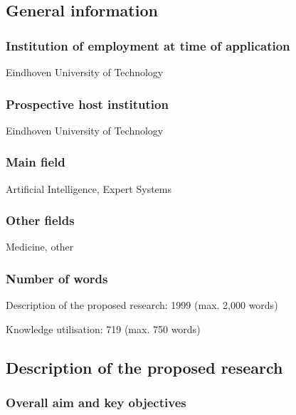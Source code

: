 \documentclass[serif, twocolumn, numeric, rga]{jote-article}
\begin{document}
\subsection*{General information}

\subsubsection*{Institution of employment at time of application}

Eindhoven University of Technology

\subsubsection*{Prospective host institution}

Eindhoven University of Technology 

\subsubsection*{Main field}

Artificial Intelligence, Expert Systems 

\subsubsection*{Other fields}

Medicine, other 

\subsubsection*{Number of words}

Description of the proposed research: 1999 (max. 2,000 words)

\noindent Knowledge utilisation: 719 (max. 750 words)

\subsection*{Description of the proposed research}



\subsubsection*{Overall aim and key objectives}
\end{document}
